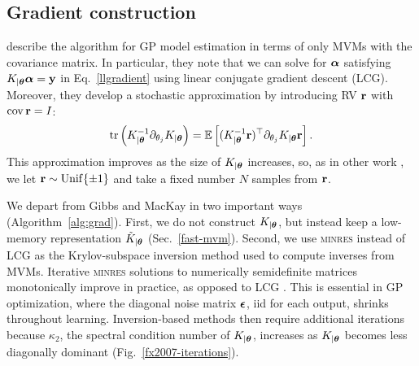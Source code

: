 \documentclass{article}
\begin{document}
\subsection{Gradient construction}

\citet{gibbs1996cient} describe the algorithm for GP model estimation in terms of only MVMs with the covariance matrix. In particular, they note that we can solve for ${\boldsymbol\alpha}$ satisfying $K_{|{\boldsymbol\theta}}{\boldsymbol\alpha}=\textbf{y}$ in Eq.~\ref{llgradient} using linear conjugate gradient descent (LCG). Moreover, they develop a stochastic approximation by introducing RV ${\textbf{r}}$ with $\operatorname{cov} {\textbf{r}}=I$:
\begin{align}
  \operatorname{tr}\left({K_{|{\boldsymbol\theta}}^{-1}\partial_{\theta_j}K_{|{\boldsymbol\theta}}}\right) = \operatorname{\mathbb{E}}\left[(K_{|{\boldsymbol\theta}}^{-1}{\textbf{r}})^\top\partial_{\theta_j}K_{|{\boldsymbol\theta}}{\textbf{r}}\right]\label{eq:trace}.
\end{align}
This approximation improves as the size of $K_{|{\boldsymbol\theta}}$ increases, so, as in other work \cite{cutajar2016preconditioning}, we let ${\textbf{r}}\sim\operatorname{Unif}\{\pm 1\}$ and take a fixed number $N$ samples from ${\textbf{r}}$.

We depart from Gibbs and MacKay in two important ways (Algorithm~\ref{alg:grad}). First, we do not construct $K_{|{\boldsymbol\theta}}$, but instead keep a low-memory representation $\tilde{K}_{|{\boldsymbol\theta}}$ (Sec.~\ref{fast-mvm}). Second, we use \textsc{minres} instead of LCG as the Krylov-subspace inversion method used to compute inverses from MVMs. Iterative \textsc{minres} solutions to numerically semidefinite matrices monotonically improve in practice, as opposed to LCG \cite{fong2012cg}. This is essential in GP optimization, where the diagonal noise matrix ${\boldsymbol\epsilon}$, iid for each output, shrinks throughout learning. Inversion-based methods then require additional iterations because $\kappa_2$, the spectral condition number of $K_{|{\boldsymbol\theta}}$, increases as $K_{|{\boldsymbol\theta}}$ becomes less diagonally dominant (Fig.~\ref{fx2007-iterations}).
\end{document}

